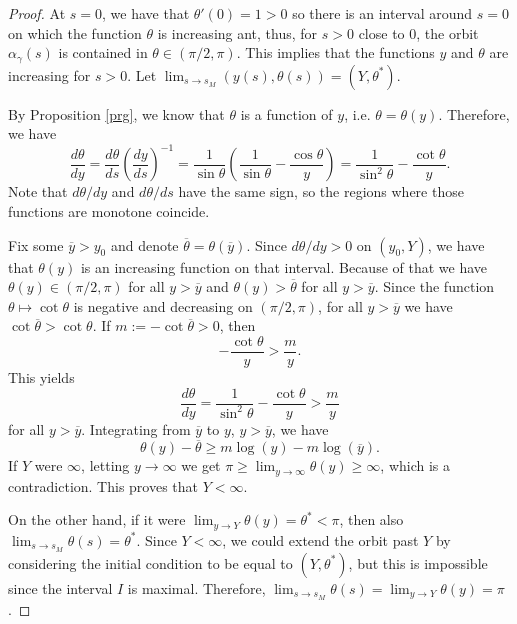 \documentclass[12pt]{amsart}
\theoremstyle{plain}
\theoremstyle{definition}
\begin{document}
\begin{proof}
At $s = 0$, we have that $\theta'(0) = 1 > 0$ so there is an interval around $s = 0$ on which the function $\theta$ is increasing ant, thus, for $s>0$ close to $0$,   the orbit $\alpha_\gamma(s)$ is contained in  $\theta \in (\pi/2, \pi)$. This implies that  the functions $y$ and $\theta$ are increasing for $s > 0$. Let $\lim_{s\to s_M}(y(s),\theta(s))=(Y,\theta^\ast)$. 



    By Proposition  \ref{prg}, we know that   $\theta$ is a function of $y$, i.e. $\theta = \theta(y)$. Therefore, we have
    $$\frac{d \theta}{dy} = \frac{d \theta}{ds}   \left( \frac{dy}{ds} \right)^{-1} = \frac{1}{\sin\theta}  \left( \frac{1}{\sin\theta} - \frac{\cos\theta}{y} \right) = \frac{1}{\sin^2 \theta} - \frac{\cot\theta}{y}.$$
    Note that $d\theta / dy$ and $d\theta / ds$ have the same sign, so the regions where those functions are monotone coincide.

    Fix some $\overline{y} > y_0$ and denote $\overline{\theta} = \theta(\overline{y})$. Since $d\theta / dy > 0$ on $(y_0, Y)$, we have that $\theta(y)$ is an increasing function on that interval. Because of that we have $\theta(y) \in (\pi/2, \pi)$ for all $y > \overline{y}$ and $\theta(y) > \overline{\theta}$ for all $y > \overline{y}$. Since the function $\theta \mapsto \cot\theta$ is negative and decreasing on $(\pi/2, \pi)$, for all $y > \overline{y}$ we have  $ \cot\overline{\theta} > \cot \theta$. If $m:= - \cot\overline{\theta}>0$, then 
    $$ -\frac{\cot\theta}{y} > \frac{m}{y}.$$
  This yields
    $$\frac{d\theta}{dy} = \frac{1}{\sin^2 \theta} - \frac{\cot\theta}{y} > \frac{m}{y}$$
    for all $ y > \overline{y}$.   Integrating   from $\overline{y}$ to $y$, $y > \overline{y}$, we have $$\theta(y) - \overline{\theta} \geq m\log(y) - m\log(\overline{y}).$$
    If $Y$ were $\infty$, letting $y \to \infty$ we get $\pi \geq \lim_{y \to \infty} \theta(y)\geq \infty$, which is a contradiction. This proves that $Y < \infty$.

    On the other hand, if it were $\lim_{y \to Y} \theta(y) = \theta^\ast < \pi$, then also $\lim_{s \to s_M} \theta(s) = \theta^\ast$. Since $Y < \infty$, we could extend the orbit past $Y$ by considering the initial condition to be equal to $(Y, \theta^\ast)$, but this is impossible since the interval $I$ is maximal. Therefore, $\lim_{s \to s_M} \theta(s) = \lim_{y \to Y} \theta(y) = \pi$.

\end{proof}
\end{document}
